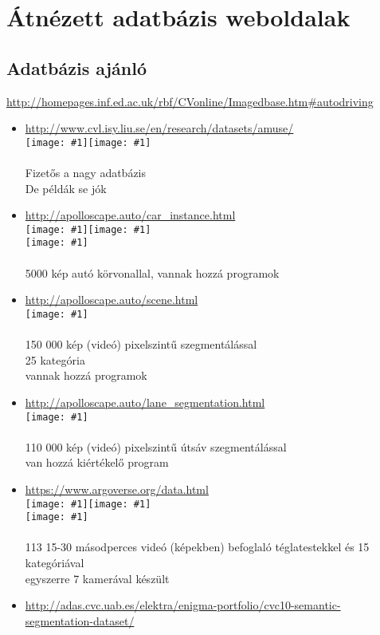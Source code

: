 \documentclass[12pt]{report}
\newcommand{\img}[1]{\texttt{[image: \#1]}}
\begin{document}
\chapter{Átnézett adatbázis weboldalak}
\section{Adatbázis ajánló}
\url{http://homepages.inf.ed.ac.uk/rbf/CVonline/Imagedbase.htm#autodriving}
\begin{itemize}
	\item \url{http://www.cvl.isy.liu.se/en/research/datasets/amuse/}
	\\	\img{1}\img{2}
	\\
	\\Fizetős a nagy adatbázis
	\\De példák se jók
	\item \url{http://apolloscape.auto/car_instance.html}
	\\	\img{3}\img{4}
	\\\img{5}
	\\
	\\5000 kép autó körvonallal, vannak hozzá programok
	\item \url{http://apolloscape.auto/scene.html}
	\\\img{6}
	\\
	\\150 000 kép (videó) pixelszintű szegmentálással
	\\25 kategória
	\\vannak hozzá programok
	\item \url{http://apolloscape.auto/lane_segmentation.html}
	\\\img{7}
	\\
	\\110 000 kép (videó) pixelszintű útsáv szegmentálással
	\\van hozzá kiértékelő program
	\item \url{https://www.argoverse.org/data.html}
	\\\img{8}\img{9}
	\\\img{10}
	\\
	\\113 15-30 másodperces videó (képekben) befoglaló téglatestekkel és 15 kategóriával
	\\egyszerre 7 kamerával készült
	\item \url{http://adas.cvc.uab.es/elektra/enigma-portfolio/cvc10-semantic-segmentation-dataset/}

\end{itemize}
\end{document}
